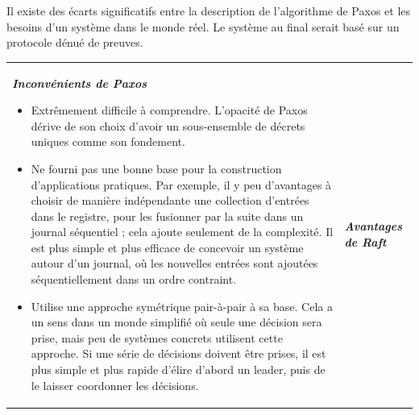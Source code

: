 Il existe des écarts significatifs entre la description de l'algorithme de Paxos
et les besoins d'un système dans le monde réel. Le système au final serait basé
sur un protocole dénué de preuves.

\begin{table}
    \begin{tabular}{p{}p{}}
        \noindent
        \textbf{\textit{Inconvénients de Paxos}}
    
        \begin{itemize}
            \item Extrêmement difficile à comprendre. L'opacité de Paxos dérive
                de son choix d'avoir un sous-ensemble de décrets uniques comme
                son fondement.
            \item Ne fourni pas une bonne base pour la construction
                d'applications pratiques. Par exemple, il y peu d'avantages à
                choisir de manière indépendante une collection d'entrées dans le
                registre, pour les fusionner par la suite dans un journal
                séquentiel ; cela ajoute seulement de la complexité. Il est plus
                simple et plus efficace de concevoir un système autour d'un
                journal, où les nouvelles entrées sont ajoutées séquentiellement
                dans un ordre contraint.
            \item Utilise une approche symétrique pair-à-pair à sa base. Cela a
                un sens dans un monde simplifié où seule une décision sera
                prise, mais peu de systèmes concrets utilisent cette approche.
                Si une série de décisions doivent être prises, il est plus
                simple et plus rapide d'élire d'abord un leader, puis de le
                laisser coordonner les décisions.
        \end{itemize} 
        
        &
    
        \textbf{\textit{Avantages de Raft}}
    

\end{tabular}
\end{table}
